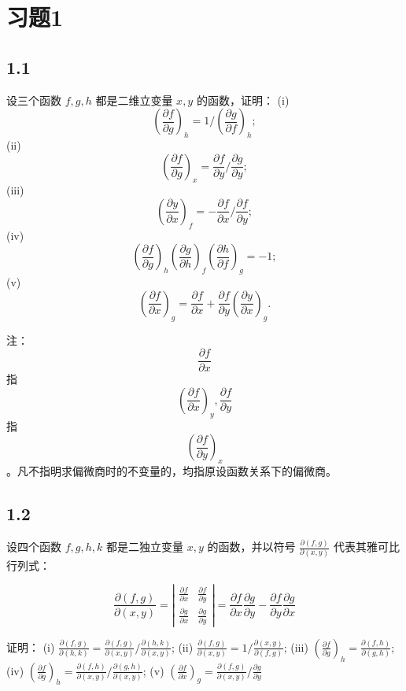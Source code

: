 \section{习题1}



\newpage
\subsection{1.1}
设三个函数 $f, g, h$ 都是二维立变量 $x, y$ 的函数，证明：
(i) $$ \left( \frac{\partial f}{\partial g} \right)_h = 1 / \left( \frac{\partial g}{\partial f} \right)_h; $$
(ii) $$ \left( \frac{\partial f}{\partial g} \right)_x = \frac{\partial f}{\partial y} / \frac{\partial g}{\partial y}; $$
(iii) $$ \left( \frac{\partial y}{\partial x} \right)_f = - \frac{\partial f}{\partial x} / \frac{\partial f}{\partial y}; $$
(iv) $$ \left( \frac{\partial f}{\partial g} \right)_h \left( \frac{\partial g}{\partial h} \right)_f \left( \frac{\partial h}{\partial f} \right)_g = -1; $$
(v) $$ \left( \frac{\partial f}{\partial x} \right)_g = \frac{\partial f}{\partial x} + \frac{\partial f}{\partial y} \left( \frac{\partial y}{\partial x} \right)_g. $$

注：$$ \frac{\partial f}{\partial x} $$ 指 $$ \left( \frac{\partial f}{\partial x} \right)_y, \frac{\partial f}{\partial y} $$ 指 $$ \left( \frac{\partial f}{\partial y} \right)_x $$。凡不指明求偏微商时的不变量的，均指原设函数关系下的偏微商。

\newpage
\subsection{1.2}
设四个函数 $f, g, h, k$ 都是二独立变量 $x, y$ 的函数，并以符号 $\frac{\partial (f, g)}{\partial (x, y)}$ 代表其雅可比行列式：

$$\frac{\partial (f, g)}{\partial (x, y)} = \left| \begin{array}{cc}
\frac{\partial f}{\partial x} & \frac{\partial f}{\partial y} \\
\frac{\partial g}{\partial x} & \frac{\partial g}{\partial y}
\end{array} \right| = \frac{\partial f}{\partial x} \frac{\partial g}{\partial y} - \frac{\partial f}{\partial y} \frac{\partial g}{\partial x}$$

证明：
(i) $\frac{\partial (f, g)}{\partial (h, k)} = \frac{\partial (f, g)}{\partial (x, y)} / \frac{\partial (h, k)}{\partial (x, y)}$;
(ii) $\frac{\partial (f, g)}{\partial (x, y)} = 1 / \frac{\partial (x, y)}{\partial (f, g)}$;
(iii) $\left( \frac{\partial f}{\partial g} \right)_h = \frac{\partial (f, h)}{\partial (g, h)}$;
(iv) $\left( \frac{\partial f}{\partial g} \right)_h = \frac{\partial (f, h)}{\partial (x, y)} / \frac{\partial (g, h)}{\partial (x, y)}$;
(v) $\left( \frac{\partial f}{\partial x} \right)_g = \frac{\partial (f, g)}{\partial (x, y)} / \frac{\partial g}{\partial y}$

